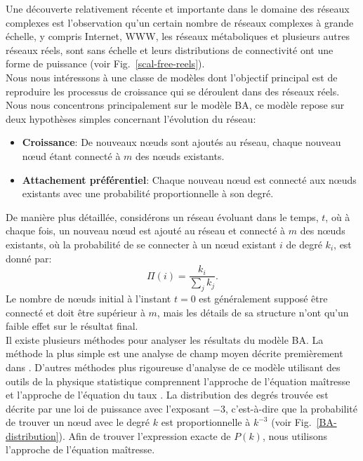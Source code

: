 Une découverte relativement récente et importante dans le domaine des réseaux complexes est l'observation qu'un certain nombre de réseaux complexes à grande échelle, y compris Internet, WWW, les réseaux métaboliques et plusieurs autres réseaux réels, sont sans échelle et leurs distributions de connectivité ont une forme de puissance (voir Fig.~\ref{scal-free-reels}).\\
Nous nous intéressons à une classe de modèles dont l'objectif principal est de reproduire les processus de croissance qui se déroulent dans des réseaux réels. Nous nous concentrons principalement sur le modèle BA, ce modèle repose sur deux hypothèses simples concernant l'évolution du réseau:
\begin{itemize}
	\item \textbf{Croissance}: De nouveaux nœuds sont ajoutés au réseau, chaque nouveau nœud étant connecté à $m$ des nœuds existants.
	\item \textbf{Attachement préférentiel}: Chaque nouveau nœud est connecté aux nœuds existants avec une probabilité proportionnelle à son degré.
\end{itemize}
De manière plus détaillée, considérons un réseau évoluant dans le temps, $t$, où à chaque fois, un nouveau nœud est ajouté au réseau et connecté à $m$ des nœuds existants, où la probabilité de se connecter à un nœud existant $i$ de degré $k_i$, est donné par:
\begin{equation}
\Pi(i)=\dfrac{k_i}{\sum_jk_j}.
\label{2-2}
\end{equation}
Le nombre de nœuds initial à l'instant $t=0$ est généralement supposé être connecté et doit être supérieur à $m$, mais les détails de sa structure n'ont qu'un faible effet sur le résultat final.\\
Il existe plusieurs méthodes pour analyser les résultats du modèle BA. La méthode la plus simple est une analyse de champ moyen décrite premièrement  dans \cite{BA1999}.
D'autres méthodes plus rigoureuse d'analyse de ce modèle utilisant des outils de la physique statistique comprennent l'approche de l'équation maîtresse \cite{Dorogovtsev-al2000-2} et l'approche de l'équation du taux \cite{Krapivsky-al2000}. La distribution des degrés trouvée est décrite par une loi de puissance avec l'exposant $-3$, c'est-à-dire que la probabilité de trouver un nœud avec le degré $k$ est proportionnelle à $k^{-3}$ (voir Fig.~\ref{BA-distribution}). Afin de trouver l'expression exacte de $P(k)$, nous utilisons l'approche de l'équation maîtresse.\\
